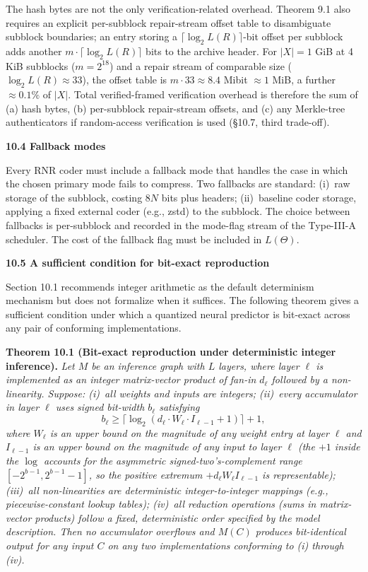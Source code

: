 \documentclass[
]{article}
\begin{document}
The hash bytes are not the only verification-related overhead.
Theorem 9.1 also requires an explicit per-subblock repair-stream
offset table to disambiguate subblock boundaries; an entry storing
a $\lceil \log_2 L(R) \rceil$-bit offset per subblock adds another
$m \cdot \lceil \log_2 L(R) \rceil$ bits to the archive header. For
$|X| = 1$ GiB at 4 KiB subblocks ($m = 2^{18}$) and a repair
stream of comparable size ($\log_2 L(R) \approx 33$), the offset
table is $m \cdot 33 \approx 8.4$ Mibit $\approx 1$ MiB, a further
$\approx 0.1\%$ of $|X|$. Total verified-framed verification
overhead is therefore the sum of (a) hash bytes, (b) per-subblock
repair-stream offsets, and (c) any Merkle-tree authenticators if
random-access verification is used (§10.7, third trade-off).

\textbf{10.4 Fallback modes}

Every RNR coder must include a fallback mode that handles the case in
which the chosen primary mode fails to compress. Two fallbacks are
standard: (i)~raw storage of the subblock, costing $8N$ bits plus
headers; (ii)~baseline coder storage, applying a fixed external coder
(e.g., zstd) to the subblock. The choice between fallbacks is
per-subblock and recorded in the mode-flag stream of the Type-III-A
scheduler. The cost of the fallback flag must be included in
$L(\Theta)$.

\textbf{10.5 A sufficient condition for bit-exact reproduction}

Section 10.1 recommends integer arithmetic as the default determinism
mechanism but does not formalize when it suffices. The following theorem
gives a sufficient condition under which a quantized neural predictor is
bit-exact across any pair of conforming implementations.

\textbf{Theorem 10.1 (Bit-exact reproduction under deterministic
integer inference).} \emph{Let $M$ be an inference graph with $L$
layers, where layer $\ell$ is implemented as an integer matrix-vector
product of fan-in $d_\ell$ followed by a non-linearity. Suppose:
(i)~all weights and inputs are integers; (ii)~every accumulator in
layer $\ell$ uses signed bit-width $b_\ell$ satisfying
\[
b_\ell \geq \lceil \log_2(d_\ell \cdot W_\ell \cdot I_{\ell-1} + 1) \rceil + 1,
\]
where $W_\ell$ is an upper bound on the magnitude of any weight entry
at layer $\ell$ and $I_{\ell-1}$ is an upper bound on the magnitude of
any input to layer $\ell$ (the $+1$ inside the $\log$ accounts for
the asymmetric signed-two's-complement range $[-2^{b-1}, 2^{b-1}-1]$,
so the positive extremum $+d_\ell W_\ell I_{\ell-1}$ is representable); (iii)~all non-linearities are deterministic
integer-to-integer mappings (e.g., piecewise-constant lookup tables);
(iv)~all reduction operations (sums in matrix-vector products) follow
a fixed, deterministic order specified by the model description. Then
no accumulator overflows and $M(C)$ produces bit-identical output for
any input $C$ on any two implementations conforming to (i) through
(iv).}
\end{document}
